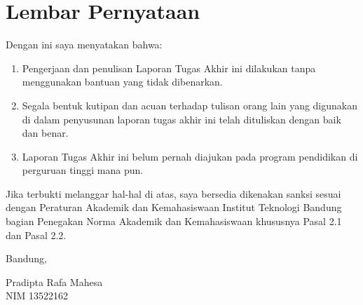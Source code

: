 \chapter*{Lembar Pernyataan}

Dengan ini saya menyatakan bahwa:

\begin{enumerate}

	\item Pengerjaan dan penulisan Laporan Tugas Akhir ini dilakukan tanpa menggunakan bantuan yang tidak dibenarkan.
	\item Segala bentuk kutipan dan acuan terhadap tulisan orang lain yang digunakan di dalam penyusunan laporan tugas akhir ini telah dituliskan dengan baik dan benar.
	\item Laporan Tugas Akhir ini belum pernah diajukan pada program pendidikan di perguruan tinggi mana pun.

\end{enumerate}

Jika terbukti melanggar hal-hal di atas, saya bersedia dikenakan sanksi sesuai dengan Peraturan Akademik dan Kemahasiswaan Institut Teknologi Bandung bagian Penegakan Norma Akademik dan Kemahasiswaan khususnya Pasal 2.1 dan Pasal 2.2.
\vspace{15mm}

Bandung, \tanggalpengesahan

\vspace{1.5cm}
Pradipta Rafa Mahesa \\
NIM 13522162
